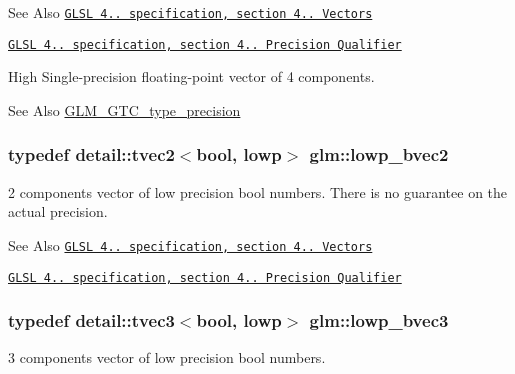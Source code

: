 \begin{DoxySeeAlso}{See Also}
\href{http://www.opengl.org/registry/doc/GLSLangSpec.4.20.8.pdf}{\tt G\-L\-S\-L 4.. specification, section 4.. Vectors} 

\href{http://www.opengl.org/registry/doc/GLSLangSpec.4.20.8.pdf}{\tt G\-L\-S\-L 4.. specification, section 4.. Precision Qualifier}
\end{DoxySeeAlso}
High Single-\/precision floating-\/point vector of 4 components. \begin{DoxySeeAlso}{See Also}
\hyperlink{group__gtc__type__precision}{G\-L\-M\-\_\-\-G\-T\-C\-\_\-type\-\_\-precision} 
\end{DoxySeeAlso}
\hypertarget{group__core__precision_ga8ff6222d4bb4245106dab0727c8e8a45}{
\subsubsection[{lowp\-\_\-bvec2}]{\setlength{\rightskip}{0pt plus 5cm}typedef detail\-::tvec2$<$bool, lowp$>$ {\bf glm\-::lowp\-\_\-bvec2}}}\label{group__core__precision_ga8ff6222d4bb4245106dab0727c8e8a45}
2 components vector of low precision bool numbers. There is no guarantee on the actual precision.

\begin{DoxySeeAlso}{See Also}
\href{http://www.opengl.org/registry/doc/GLSLangSpec.4.20.8.pdf}{\tt G\-L\-S\-L 4.. specification, section 4.. Vectors} 

\href{http://www.opengl.org/registry/doc/GLSLangSpec.4.20.8.pdf}{\tt G\-L\-S\-L 4.. specification, section 4.. Precision Qualifier} 
\end{DoxySeeAlso}
\hypertarget{group__core__precision_ga17ac2986f7b315a2ac4ee2662b5be9cb}{
\subsubsection[{lowp\-\_\-bvec3}]{\setlength{\rightskip}{0pt plus 5cm}typedef detail\-::tvec3$<$bool, lowp$>$ {\bf glm\-::lowp\-\_\-bvec3}}}\label{group__core__precision_ga17ac2986f7b315a2ac4ee2662b5be9cb}
3 components vector of low precision bool numbers.

